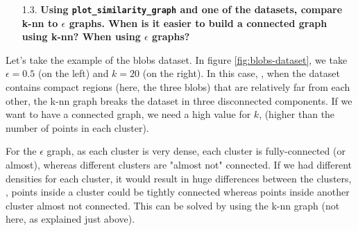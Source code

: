 \documentclass[a4paper, 11pt]{article}
\begin{document}
    \pagebreak
    
\begin{itemize}
    \item[1.3.] \textbf{Using \texttt{plot\_similarity\_graph} and one of the datasets, compare k-nn to $\epsilon$ graphs. When is it easier to build a connected graph using k-nn? When using $\epsilon$ graphs?}
\end{itemize}

    Let's take the example of the blobs dataset. In figure \ref{fig:blobs-dataset}, we take $\epsilon = 0.5$ (on the left) and $k = 20$ (on the right). In this case, \ie, when the dataset contains compact regions (here, the three blobs) that are relatively far from each other, the k-nn graph breaks the dataset in three disconnected components. If we want to have a connected graph, we need a high value for $k$, (\eg higher than the number of points in each cluster).
    
    For the $\epsilon$ graph, as each cluster is very dense, each cluster is fully-connected (or almost), whereas different clusters are "almost not" connected. If we had different densities for each cluster, it would result in huge differences between the clusters, \ie, points inside a cluster could be tightly connected whereas points inside another cluster almost not connected. This can be solved by using the k-nn graph (not here, as explained just above).
    
\end{document}
